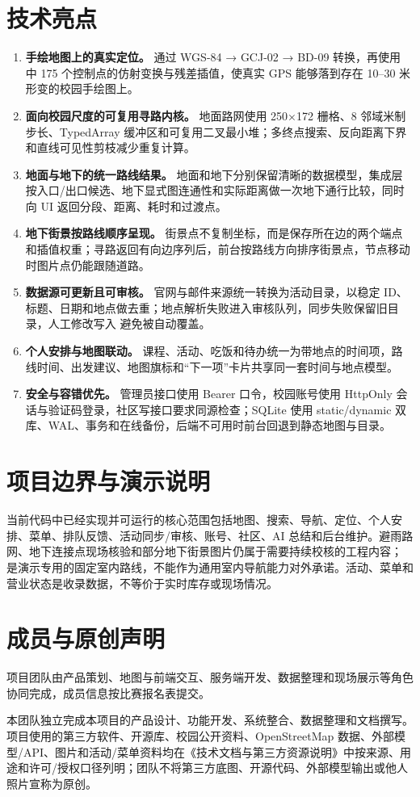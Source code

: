 \documentclass[UTF8,a4paper,12pt]{ctexart}
\begin{document}
\section{技术亮点}
\begin{enumerate}
\item \textbf{手绘地图上的真实定位。} 通过 WGS-84 → GCJ-02 → BD-09 转换，再使用 \texttt{} 中 175 个控制点的仿射变换与残差插值，使真实 GPS 能够落到存在 10–30 米形变的校园手绘图上。
\item \textbf{面向校园尺度的可复用寻路内核。} 地面路网使用 250×172 栅格、8 邻域米制步长、TypedArray 缓冲区和可复用二叉最小堆；多终点搜索、反向距离下界和直线可见性剪枝减少重复计算。
\item \textbf{地面与地下的统一路线结果。} 地面和地下分别保留清晰的数据模型，集成层按入口/出口候选、地下显式图连通性和实际距离做一次地下通行比较，同时向 UI 返回分段、距离、耗时和过渡点。
\item \textbf{地下街景按路线顺序呈现。} 街景点不复制坐标，而是保存所在边的两个端点和插值权重；寻路返回有向边序列后，前台按路线方向排序街景点，节点移动时图片点仍能跟随道路。
\item \textbf{数据源可更新且可审核。} 官网与邮件来源统一转换为活动目录，以稳定 ID、标题、日期和地点做去重；地点解析失败进入审核队列，同步失败保留旧目录，人工修改写入 \texttt{} 避免被自动覆盖。
\item \textbf{个人安排与地图联动。} 课程、活动、吃饭和待办统一为带地点的时间项，路线时间、出发建议、地图旗标和“下一项”卡片共享同一套时间与地点模型。
\item \textbf{安全与容错优先。} 管理员接口使用 Bearer 口令，校园账号使用 HttpOnly 会话与验证码登录，社区写接口要求同源检查；SQLite 使用 static/dynamic 双库、WAL、事务和在线备份，后端不可用时前台回退到静态地图与目录。
\end{enumerate}
\section{项目边界与演示说明}
当前代码中已经实现并可运行的核心范围包括地图、搜索、导航、定位、个人安排、菜单、排队反馈、活动同步/审核、账号、社区、AI 总结和后台维护。避雨路网、地下连接点现场核验和部分地下街景图片仍属于需要持续校核的工程内容；\texttt{} 是演示专用的固定室内路线，不能作为通用室内导航能力对外承诺。活动、菜单和营业状态是收录数据，不等价于实时库存或现场情况。\par
\section{成员与原创声明}
项目团队由产品策划、地图与前端交互、服务端开发、数据整理和现场展示等角色协同完成，成员信息按比赛报名表提交。\par
本团队独立完成本项目的产品设计、功能开发、系统整合、数据整理和文档撰写。项目使用的第三方软件、开源库、校园公开资料、OpenStreetMap 数据、外部模型/API、图片和活动/菜单资料均在《技术文档与第三方资源说明》中按来源、用途和许可/授权口径列明；团队不将第三方底图、开源代码、外部模型输出或他人照片宣称为原创。\par
\end{document}
